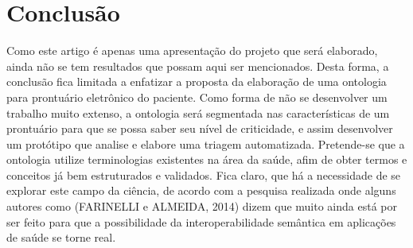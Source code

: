 \section{Conclusão}
Como este artigo é apenas uma apresentação do projeto que será elaborado, ainda não se tem resultados que possam aqui ser mencionados. Desta forma, a conclusão fica limitada a enfatizar a proposta da elaboração de uma ontologia para prontuário eletrônico do paciente. Como forma de não se desenvolver um trabalho muito extenso, a ontologia será segmentada nas características de um prontuário para que se possa saber seu nível de criticidade, e assim desenvolver um protótipo que analise e elabore uma triagem automatizada. Pretende-se que a ontologia utilize terminologias existentes na área da saúde, afim de obter termos e conceitos já bem estruturados e validados. Fica claro, que há a necessidade de se explorar este campo da ciência, de acordo com a pesquisa realizada onde alguns autores como (FARINELLI e ALMEIDA, 2014)\cite{INTEROPENEHR} dizem que muito ainda
está por ser feito para que a possibilidade da interoperabilidade semântica em aplicações de saúde se torne real.




